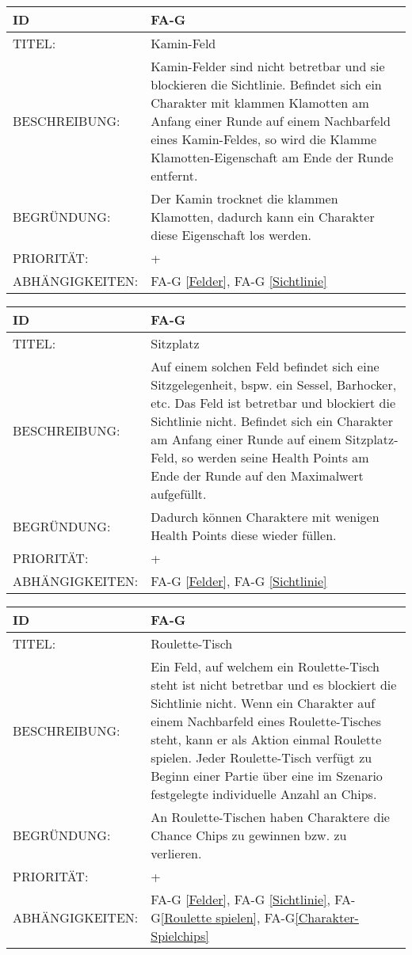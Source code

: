 \begin{tabularx}{16cm}{l|X}
	{table}\label{Kamin-Feld}
	\textbf{ID} & \textbf{FA-G \arabic{table}} \\
	\hline
	TITEL: & Kamin-Feld \\
	\hline
	BESCHREIBUNG: & Kamin-Felder sind nicht betretbar und sie blockieren die Sichtlinie. Befindet sich ein Charakter mit klammen Klamotten am Anfang einer Runde auf einem Nachbarfeld eines Kamin-Feldes, so wird die Klamme Klamotten-Eigenschaft am Ende der Runde entfernt. \\
	\hline
	BEGRÜNDUNG: & Der Kamin trocknet die klammen Klamotten, dadurch kann ein Charakter diese Eigenschaft los werden. \\
	\hline
	PRIORITÄT: & +\\
	\hline
	ABHÄNGIGKEITEN: & FA-G \ref{Felder}, FA-G \ref{Sichtlinie} \\
\end{tabularx}

\begin{tabularx}{16cm}{l|X}
	{table}\label{Sitzplatz}
	\textbf{ID} & \textbf{FA-G \arabic{table}} \\
	\hline
	TITEL: & Sitzplatz \\
	\hline
	BESCHREIBUNG: & Auf einem solchen Feld befindet sich eine Sitzgelegenheit, bspw. ein Sessel, Barhocker, etc. Das Feld ist betretbar und blockiert die Sichtlinie nicht. Befindet sich ein Charakter am Anfang einer Runde auf einem Sitzplatz-Feld, so werden seine Health Points am Ende der Runde auf den Maximalwert aufgefüllt. \\
	\hline
	BEGRÜNDUNG: & Dadurch können Charaktere mit wenigen Health Points diese wieder füllen. \\
	\hline
	PRIORITÄT: & +\\
	\hline
	ABHÄNGIGKEITEN: & FA-G \ref{Felder}, FA-G \ref{Sichtlinie} \\
\end{tabularx}


\begin{tabularx}{16cm}{l|X}
	{table}\label{Roulette-Tisch}
	\textbf{ID} & \textbf{FA-G \arabic{table}} \\
	\hline
	TITEL: & Roulette-Tisch \\
	\hline
	BESCHREIBUNG: & Ein Feld, auf welchem ein Roulette-Tisch steht ist nicht betretbar und es blockiert die Sichtlinie nicht. Wenn ein Charakter auf einem Nachbarfeld eines Roulette-Tisches steht, kann er als Aktion einmal Roulette spielen. Jeder Roulette-Tisch verfügt zu Beginn einer Partie über eine im Szenario festgelegte individuelle Anzahl an Chips. \\
	\hline
	BEGRÜNDUNG: & An Roulette-Tischen haben Charaktere die Chance Chips zu gewinnen bzw. zu verlieren. \\
	\hline
	PRIORITÄT: & +\\ 
	\hline
	ABHÄNGIGKEITEN: & FA-G \ref{Felder}, FA-G \ref{Sichtlinie}, FA-G\ref{Roulette spielen}, FA-G\ref{Charakter-Spielchips} \\
\end{tabularx}

